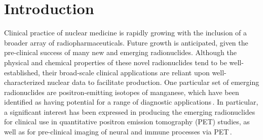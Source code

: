 
\section{\label{sec:intro_fe}Introduction}




Clinical practice of nuclear medicine is rapidly growing with the inclusion of a broader array of radiopharmaceuticals. 
Future growth is anticipated, given the pre-clinical success of many  new and emerging radionuclides. 
Although the physical and chemical properties of these novel radionuclides tend to be
well-established, their broad-scale  clinical applications are reliant upon well-characterized nuclear data to facilitate 
production. 
% 
% 
% 
One particular set of  emerging radionuclides are 
positron-emitting isotopes of manganese, which have been identified as having potential for a range of diagnostic applications\,\cite{J.2013,Graves2015,Lewis2015,PhysRevC.96.014613,Wooten2017,Hernandez2017}.
In particular, a significant interest has been expressed in producing the emerging radionuclides  for clinical use in quantitative positron emission tomography (PET) studies, as well as   for pre-clinical imaging of neural and immune processes via PET\,\cite{Graves2016}. 




